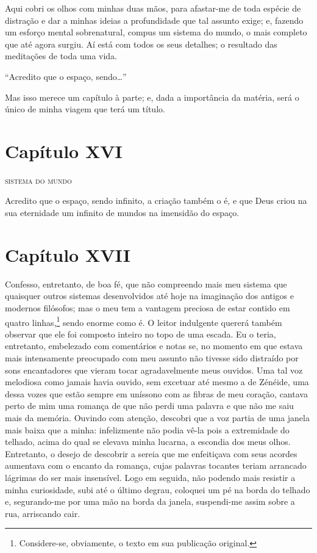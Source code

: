  Aqui cobri os olhos com minhas duas mãos, para afastar-me de toda
espécie de distração e dar a minhas ideias a profundidade que tal
assunto exige; e, fazendo um esforço mental sobrenatural, compus um
sistema do mundo, o mais completo que até agora surgiu. Aí está com
todos os seus detalhes; o resultado das meditações de toda uma vida.

``Acredito que o espaço, sendo\ldots''

 Mas isso merece um capítulo à parte; e, dada a importância da matéria,
será o único de minha viagem que terá um título.

\section*{Capítulo XVI}

\textsc{sistema do mundo}

 Acredito que o espaço, sendo infinito, a criação também o é, e que Deus
criou na sua eternidade um infinito de mundos na imensidão do espaço.

\section*{Capítulo XVII}

 Confesso, entretanto, de boa fé, que não compreendo mais meu sistema
que quaisquer outros sistemas desenvolvidos até hoje na imaginação dos
antigos e modernos filósofos; mas o meu tem a vantagem preciosa de
estar contido em quatro linhas,\footnote{ Considere-se, obviamente, o
texto em sua publicação original.} sendo enorme como é. O leitor
indulgente quererá também observar que ele foi composto inteiro no topo
de uma escada. Eu o teria, entretanto, embelezado com comentários e
notas se, no momento em que estava mais intensamente preocupado com meu
assunto não tivesse sido distraído por sons encantadores que vieram
tocar agradavelmente meus ouvidos. Uma tal voz melodiosa como jamais
havia ouvido, sem excetuar até mesmo a de Zénéide, uma dessa vozes que
estão sempre em uníssono com as fibras de meu coração, cantava perto de
mim uma romança de que não perdi uma palavra e que não me saiu mais da
memória. Ouvindo com atenção, descobri que a voz partia de uma janela
mais baixa que a minha: infelizmente não podia vê-la pois a extremidade
do telhado, acima do qual se elevava minha lucarna, a escondia dos meus
olhos. Entretanto, o desejo de descobrir a sereia que me enfeitiçava
com seus acordes aumentava com o encanto da romança, cujas
palavras tocantes teriam arrancado lágrimas do ser mais insensível.
Logo em seguida, não podendo mais resistir a minha curiosidade, subi
até o último degrau, coloquei um pé na borda do telhado e, segurando-me
por uma mão na borda da janela, suspendi-me assim sobre a rua,
arriscando cair. 

